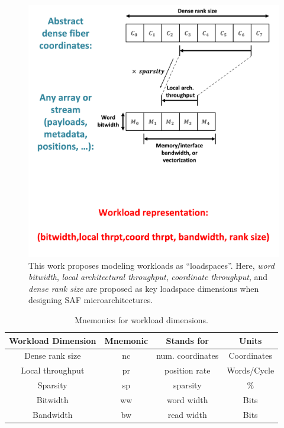 \begin{itemize}
\begin{figure}[H]
    \centering
    \includegraphics[width=\linewidth]{figures/workload_representation.png}
    \caption{This work proposes modeling workloads as ``loadspaces''. Here, \textit{word bitwidth},  \textit{local architectural throughput}, \textit{coordinate throughput}, and \textit{dense rank size} are proposed as key loadspace dimensions when designing SAF microarchitectures.}
    \label{fig:workload_representation}
\end{figure}

    \begin{table}[h]
        \centering
        \caption{Mnemonics for workload dimensions.}
        \label{table:workload_dimension_mnemonics}
        \begin{tabular}{||c|c|c|c||}
            \hline \hline
            Workload Dimension & Mnemonic & Stands for & Units \\
            \hline \hline
            Dense rank size & nc & num. coordinates & Coordinates \\
            \hline
            Local throughput & pr & position rate & Words/Cycle \\
            \hline
            Sparsity & sp & sparsity & \% \\
            \hline
            Bitwidth & ww & word width & Bits \\
            \hline
            Bandwidth & bw & read width & Bits \\
            \hline \hline
        \end{tabular}
    \end{table}


\end{itemize}
